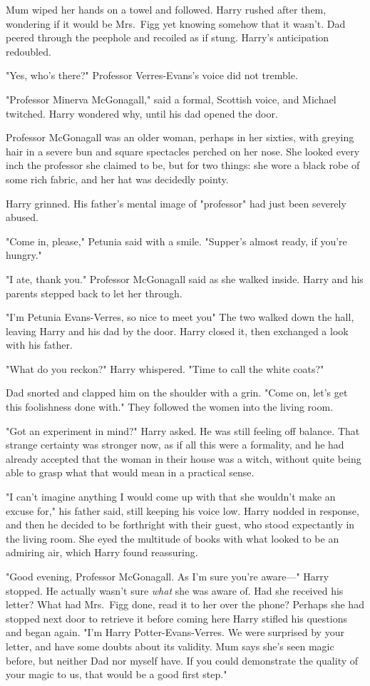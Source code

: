 Mum wiped her hands on a towel and followed. Harry
rushed after them, wondering if it would be Mrs.~Figg yet
knowing somehow that it wasn't. Dad peered through the
peephole and recoiled as if stung. Harry's anticipation redoubled.

"Yes, who's there?" Professor Verres-Evans's voice did not tremble.

"Professor Minerva McGonagall," said a formal, Scottish
voice, and Michael twitched. Harry wondered why, until his
dad opened the door.

Professor McGonagall was an older woman, perhaps in her
sixties, with greying hair in a severe bun and square
spectacles perched on her nose. She looked every inch
the professor she claimed to be, but for two things: she
wore a black robe of some rich fabric, and her hat was
decidedly pointy.

Harry grinned. His father's mental image of "professor" had
just been severely abused.

"Come in, please," Petunia said with a smile. "Supper's
almost ready, if you're hungry."

"I ate, thank you." Professor McGonagall said as she walked
inside. Harry and his parents stepped back to let her through.

"I'm Petunia Evans-Verres, so nice to meet you{\el}" The two
walked down the hall, leaving Harry and his dad by the
door. Harry closed it, then exchanged a look with his father.

"What do you reckon?" Harry whispered. "Time to call the white coats?"

Dad snorted and clapped him on the shoulder with a grin.
"Come on, let's get this foolishness done with." They
followed the women into the living room.

"Got an experiment in mind?" Harry asked. He was still
feeling off balance. That strange certainty was stronger
now, as if all this were a formality, and he had already
accepted that the woman in their house was a witch,
without quite being able to grasp what that would mean in
a practical sense.

"I can't imagine anything I would come up with that she
wouldn't make an excuse for," his father said, still keeping
his voice low. Harry nodded in response, and then he decided to be forthright
with their guest, who stood expectantly in the living room.
She eyed the multitude of books with what looked to be
an admiring air, which Harry found reassuring.

"Good evening, Professor McGonagall. As I'm sure you're
aware—" Harry stopped. He actually wasn't sure \emph{what} she
was aware of. Had she received his letter? What had Mrs.~Figg done,
read it to her over the phone? Perhaps she
had stopped next door to retrieve it before coming here{\el}
Harry stifled his questions and began again. "I'm Harry
Potter-Evans-Verres. We were surprised by your letter, and
have some doubts about its validity. Mum says she's seen
magic before, but neither Dad nor myself have. If you
could demonstrate the quality of your magic to us, that
would be a good first step."

